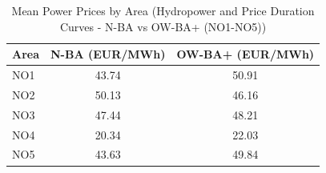 \begin{table}[htbp]
\centering
\caption{Mean Power Prices by Area (Hydropower and Price Duration Curves - N-BA vs OW-BA+ (NO1-NO5))}
\label{tab:mean_prices_NO_areas_N_BA_OW_BA_plus}
\begin{tabular}{lcc}
\hline
Area & N-BA (EUR/MWh) & OW-BA+ (EUR/MWh) \\
\hline
NO1 & 43.74 & 50.91 \\
NO2 & 50.13 & 46.16 \\
NO3 & 47.44 & 48.21 \\
NO4 & 20.34 & 22.03 \\
NO5 & 43.63 & 49.84 \\
\hline
\end{tabular}
\end{table}